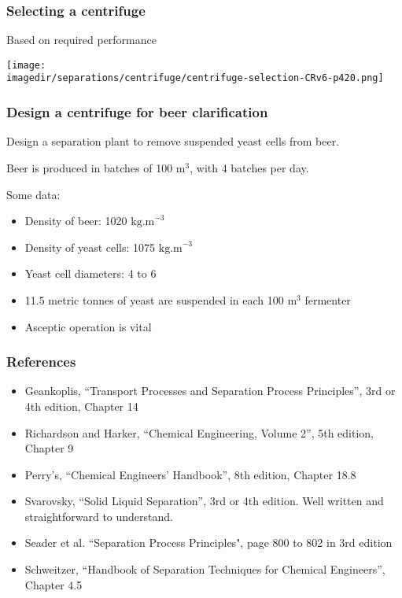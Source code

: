 \begin{frame}\frametitle{Selecting a centrifuge}
	Based on required performance
	\begin{center}
		\texttt{[image: \\imagedir/separations/centrifuge/centrifuge-selection-CRv6-p420.png]}
	\end{center}
\end{frame}

\begin{frame}\frametitle{Design a centrifuge for beer clarification}
	Design a separation plant to remove suspended yeast cells from beer.
	
	\vspace{12pt}
	Beer is produced in batches of 100 $\text{m}^3$, with 4 batches per day.
	
	\vspace{12pt}
	Some data:
	\begin{itemize}
		\item	Density of beer: 1020 $\text{kg.m}^{-3}$
		\item	Density of yeast cells: 1075 $\text{kg.m}^{-3}$
		\item	Yeast cell diameters: 4 to 6 \micron
		\item	11.5 metric tonnes of yeast are suspended in each 100 $\text{m}^3$ fermenter
		\item	Asceptic operation is vital		
	\end{itemize} 
\end{frame}

\begin{frame}\frametitle{References}
	\begin{itemize}
		\item	Geankoplis, ``Transport Processes and Separation Process Principles'', 3rd or 4th edition, Chapter 14
		\item	Richardson and Harker, ``Chemical Engineering, Volume 2'', 5th edition, Chapter 9
		\item	Perry's, ``Chemical Engineers' Handbook'', 8th edition, Chapter 18.8 
		\item	Svarovsky, ``Solid Liquid Separation'', 3rd or 4th edition. Well written and straightforward to understand.
		\item	Seader et al. ``Separation Process Principles", page 800 to 802 in 3rd edition 
		\item	Schweitzer, ``Handbook of Separation Techniques for Chemical Engineers'', Chapter 4.5
	\end{itemize}
\end{frame}
